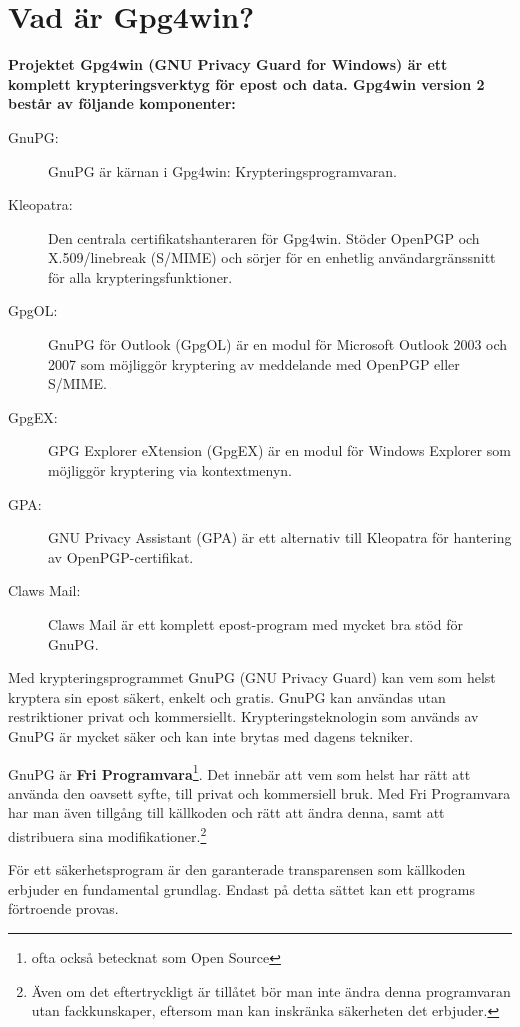 \documentclass[a4paper,11pt, oneside,openright,titlepage,dvips]{scrbook}
\newcounter{chapter}
\begin{document}
\chapter{Vad är Gpg4win?}

\textbf{Projektet Gpg4win (GNU Privacy Guard for Windows) är ett komplett
krypteringsverktyg för epost och data. Gpg4win version 2 består av följande
komponenter:}

\begin{description}
    \item[GnuPG:] GnuPG är kärnan i Gpg4win: Krypteringsprogramvaran.
    \item[Kleopatra:] Den centrala certifikatshanteraren för Gpg4win.
	Stöder OpenPGP och X.509/linebreak (S/MIME) och sörjer för en
	enhetlig användargränssnitt för alla krypteringsfunktioner.
    \item[GpgOL:] GnuPG för Outlook (GpgOL) är en modul för Microsoft
	Outlook 2003 och 2007 som möjliggör kryptering av meddelande med
	OpenPGP eller S/MIME.
    \item[GpgEX:] GPG Explorer eXtension (GpgEX) är en modul för Windows
	Explorer som möjliggör kryptering via kontextmenyn.
    \item[GPA:] GNU Privacy Assistant (GPA) är ett alternativ till Kleopatra
	för hantering av OpenPGP-certifikat.
    \item[Claws Mail:] Claws Mail är ett komplett epost-program med mycket
	bra stöd för GnuPG.
\end{description}

Med krypteringsprogrammet GnuPG (GNU Privacy Guard) kan vem som helst 
kryptera sin epost säkert, enkelt och gratis. GnuPG kan användas utan
restriktioner privat och kommersiellt. Krypteringsteknologin som används
av GnuPG är mycket säker och kan inte brytas med dagens tekniker.

GnuPG är \textbf{Fri Programvara}\footnote{ofta också betecknat som Open
Source}. Det innebär att vem som helst har rätt att använda den oavsett
syfte, till privat och kommersiell bruk. Med Fri Programvara har man även
tillgång till källkoden och rätt att ändra denna, samt att distribuera sina
modifikationer.\footnote{Även om det eftertryckligt är tillåtet bör man inte
ändra denna programvaran utan fackkunskaper, eftersom man kan inskränka
säkerheten det erbjuder.}

För ett säkerhetsprogram är den garanterade transparensen som källkoden
erbjuder en fundamental grundlag. Endast på detta sättet kan ett programs
förtroende provas.
\end{document}
